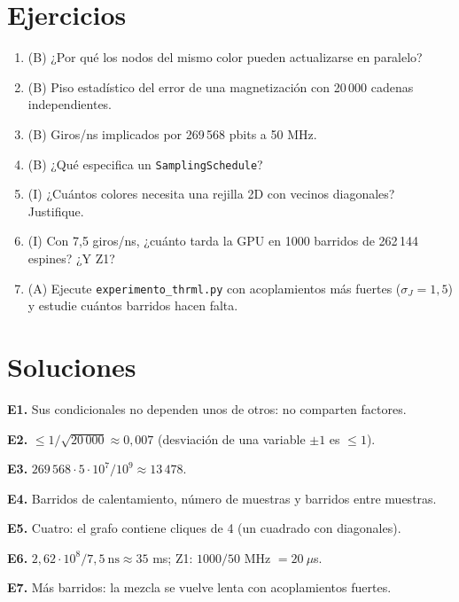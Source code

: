 \documentclass[11pt,a4paper]{article}
\begin{document}
\section{Ejercicios}
\begin{enumerate}[label=\textbf{E\arabic*.}]
\item (B) ¿Por qué los nodos del mismo color pueden actualizarse en paralelo?
\item (B) Piso estadístico del error de una magnetización con 20\,000 cadenas independientes.
\item (B) Giros/ns implicados por 269\,568 pbits a 50 MHz.
\item (B) ¿Qué especifica un \texttt{SamplingSchedule}?
\item (I) ¿Cuántos colores necesita una rejilla 2D con vecinos diagonales? Justifique.
\item (I) Con 7{,}5 giros/ns, ¿cuánto tarda la GPU en 1000 barridos de 262\,144 espines? ¿Y Z1?
\item (A) Ejecute \texttt{experimento\_thrml.py} con acoplamientos más fuertes ($\sigma_J=1{,}5$) y estudie cuántos barridos hacen falta.
\end{enumerate}
\section{Soluciones}
\begin{solucion}
\textbf{E1.} Sus condicionales no dependen unos de otros: no comparten factores.

\textbf{E2.} $\le1/\sqrt{20\,000}\approx0{,}007$ (desviación de una variable $\pm1$ es $\le1$).

\textbf{E3.} $269\,568\cdot5\cdot10^7/10^9\approx13\,478$.

\textbf{E4.} Barridos de calentamiento, número de muestras y barridos entre muestras.

\textbf{E5.} Cuatro: el grafo contiene cliques de 4 (un cuadrado con diagonales).

\textbf{E6.} $2{,}62\cdot10^8/7{,}5\ \text{ns}\approx35$ ms; Z1: $1000/50$ MHz $=20\ \mu$s.

\textbf{E7.} Más barridos: la mezcla se vuelve lenta con acoplamientos fuertes.
\end{solucion}
\end{document}
